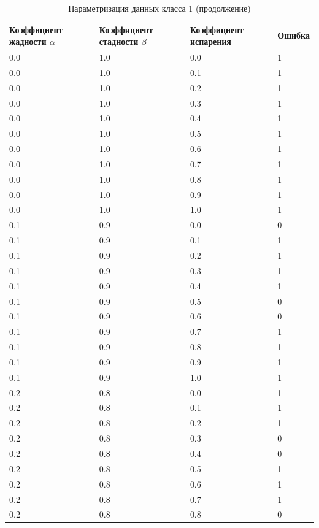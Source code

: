 \documentclass{bmstu}[a4paper]
\begin{document}
\begin{longtable}{|p{}|p{}|p{}|p{}|}
	\caption{Параметризация данных класса 1 (продолжение)}  \\\hline
	Коэффициент жадности $\alpha$ & Коэффициент стадности $\beta$ & Коэффициент испарения & Ошибка   \\\hline
	\endhead
	0.0 &  1.0 &  0.0 &     1  \\\hline
	0.0 &  1.0 &  0.1 &     1  \\\hline
	0.0 &  1.0 &  0.2 &     1  \\\hline
	0.0 &  1.0 &  0.3 &     1  \\\hline
	0.0 &  1.0 &  0.4 &     1  \\\hline
	0.0 &  1.0 &  0.5 &     1  \\\hline
	0.0 &  1.0 &  0.6 &     1  \\\hline
	0.0 &  1.0 &  0.7 &     1  \\\hline
	0.0 &  1.0 &  0.8 &     1  \\\hline
	0.0 &  1.0 &  0.9 &     1  \\\hline
	0.0 &  1.0 &  1.0 &     1  \\\hline
	0.1 &  0.9 &  0.0 &     0  \\\hline
	0.1 &  0.9 &  0.1 &     1  \\\hline
	0.1 &  0.9 &  0.2 &     1  \\\hline
	0.1 &  0.9 &  0.3 &     1  \\\hline
	0.1 &  0.9 &  0.4 &     1  \\\hline
	0.1 &  0.9 &  0.5 &     0  \\\hline
	0.1 &  0.9 &  0.6 &     0  \\\hline
	0.1 &  0.9 &  0.7 &     1  \\\hline
	0.1 &  0.9 &  0.8 &     1 \\\hline
	0.1 &  0.9 &  0.9 &     1 \\\hline
	0.1 &  0.9 &  1.0 &     1 \\\hline
	0.2 &  0.8 &  0.0 &     1 \\\hline
	0.2 &  0.8 &  0.1 &     1 \\\hline
	0.2 &  0.8 &  0.2 &     1 \\\hline
	0.2 &  0.8 &  0.3 &     0 \\\hline
	0.2 &  0.8 &  0.4 &     0 \\\hline
	0.2 &  0.8 &  0.5 &     1 \\\hline
	0.2 &  0.8 &  0.6 &     1 \\\hline
	0.2 &  0.8 &  0.7 &     1 \\\hline
	0.2 &  0.8 &  0.8 &     0 \\\hline

\end{longtable}
\end{document}
